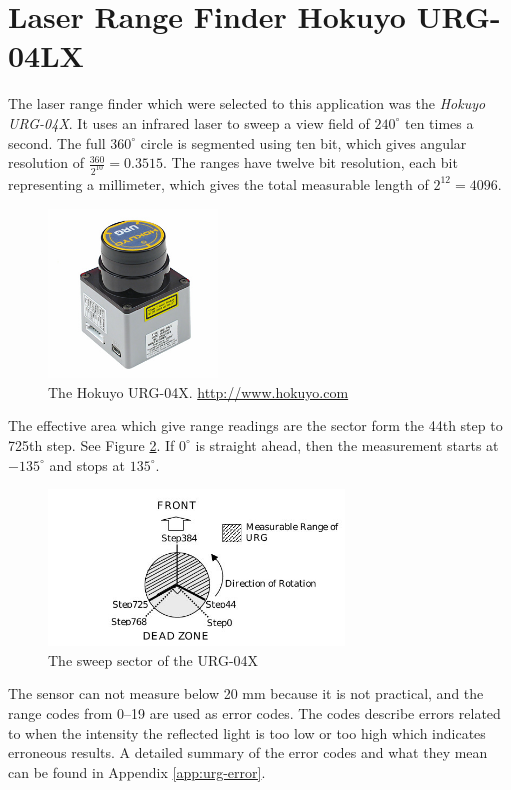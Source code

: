 \section{Laser Range Finder Hokuyo URG-04LX}
\label{chap3:sec-urg}
The laser range finder which were selected to this application was the \emph{Hokuyo
URG-04X}. It uses an infrared laser to sweep a view field of $240^\circ$ ten times a
second. The full $360^\circ$ circle is segmented using ten bit, which gives angular
resolution of $\frac{360}{2^{10}} = 0.3515$. The ranges have twelve bit resolution, each
bit representing a millimeter, which gives the total measurable length of $2^{12} = 4096$.
\begin{figure}[htbp]
    \centering
    \includegraphics[width=0.4\textwidth]{pics/urg04lx}
    \caption[The Hokuyo URG-04X.]{The Hokuyo URG-04X. \url{http://www.hokuyo.com}}
    \label{chap3:fig-urg}
\end{figure}
The effective area which give range readings are the sector form the 44th step to
725th step. See Figure \ref{chap3:fig-urg-sector}. If $0^\circ$ is straight ahead, then
the measurement starts at $-135^\circ$ and stops at $135^\circ$. 
\begin{figure}[htbp]
    \centering
    \includegraphics[width=0.7\textwidth]{pics/urg-sector}
    \caption{The sweep sector of the URG-04X}
    \label{chap3:fig-urg-sector}
\end{figure}

The sensor can not measure below 20 mm because it is not practical, and the range codes
from 0--19 are used as error codes. The codes describe errors related to when the intensity 
the reflected light
is too low or too high which indicates erroneous results. A detailed summary of the
error codes and what they mean can be found in Appendix \ref{app:urg-error}.


